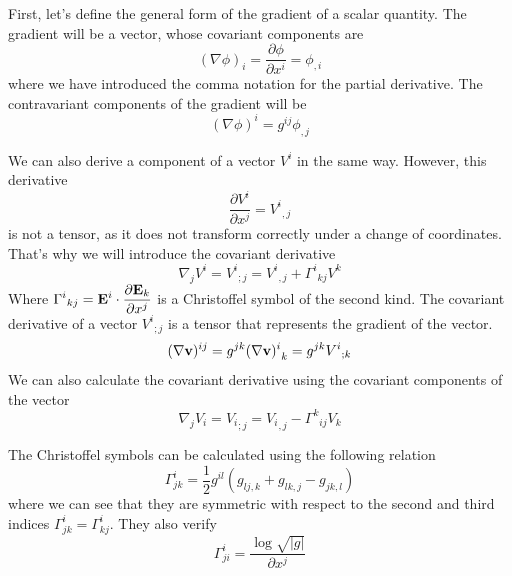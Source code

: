 First, let's define the general form of the gradient of a scalar quantity. The gradient will be a vector,
whose covariant components are
\begin{equation}
(\nabla\phi)_i=\frac{\partial\phi}{\partial x^i}=\phi_{,i}
\end{equation}
where we have introduced the comma notation for the partial derivative. The contravariant components of 
the gradient will be
\begin{equation}
(\nabla\phi)^i=g^{ij}\phi_{,j}
\end{equation}

We can also derive a component of a vector $V^i$ in the same way. However, this derivative
\begin{equation}
\frac{\partial V^i}{\partial x^j}={V^i}_{,j}
\end{equation}
is not a tensor, as it does not transform correctly under a change of coordinates. That's why we will introduce
the covariant derivative
\begin{equation}
\nabla_jV^i={V^i}_{;j}={V^i}_{,j}+{\Gamma^i}_{kj}V^k
\end{equation}
Where $\displaystyle{\Gamma^i}_{kj}=\mathbf{E}^i\cdot\frac{\partial \mathbf{E}_k}{\partial x^j}$
is a Christoffel symbol of the second kind. The covariant derivative of a vector ${V^i}_{;j}$ is a tensor
that represents the gradient of the vector.
\begin{equation}
(\nabla\mathbf{v})^{ij}=g^{jk}{(\nabla\mathbf{v})^i}_k=g^{jk}{V^i}_{;k}
\end{equation}
We can also calculate the covariant derivative using the covariant components of the vector
\begin{equation}
\nabla_jV_i={V_i}_{;j}={V_i}_{,j}-{\Gamma^k}_{ij}V_k
\end{equation}

The Christoffel symbols can be calculated using the following relation
\begin{equation}
\Gamma^i_{jk}=
\frac{1}{2}g^{il}(g_{lj,k}+g_{lk,j}-g_{jk,l})
\end{equation}
where we can see that they are symmetric with respect to the second and third indices $\Gamma^i_{jk}=\Gamma^i_{kj}$.
They also verify
\begin{equation}
\Gamma^{i}_{ji}=\frac{\log\sqrt{|g|}}{\partial x^j}
\end{equation}

